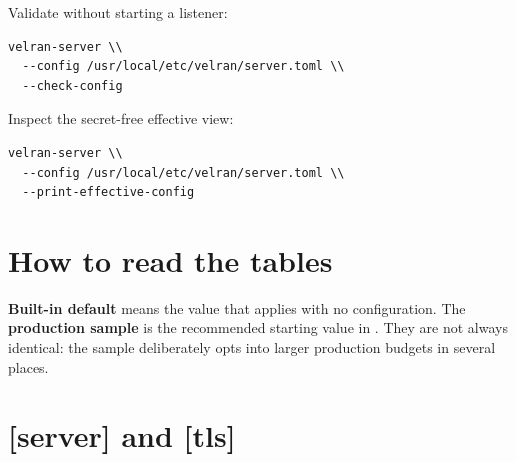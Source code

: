 Validate without starting a listener:

\begin{lstlisting}
velran-server \\
  --config /usr/local/etc/velran/server.toml \\
  --check-config
\end{lstlisting}

Inspect the secret-free effective view:

\begin{lstlisting}
velran-server \\
  --config /usr/local/etc/velran/server.toml \\
  --print-effective-config
\end{lstlisting}

\section{How to read the tables}

\textbf{Built-in default} means the value that applies with no configuration. The \textbf{production sample} is the recommended starting value in . They are not always identical: the sample deliberately opts into larger production budgets in several places.

\section{[server] and [tls]}

